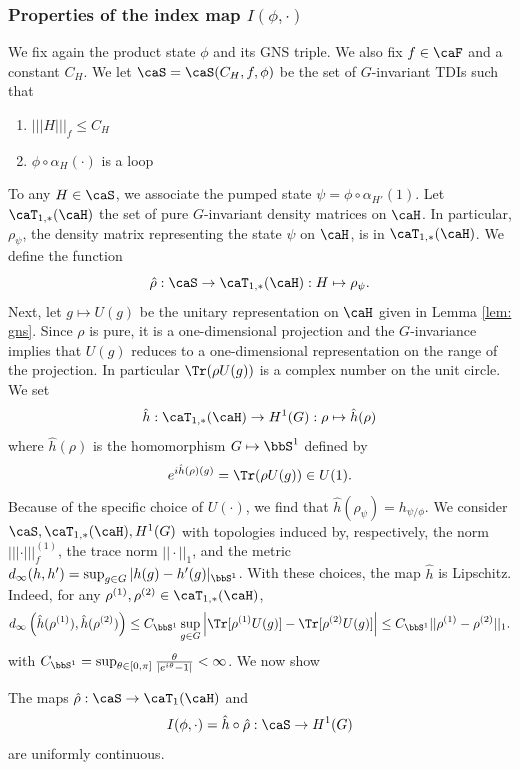 \subsubsection{Properties of the index map $I(\phi,\cdot)$}

We fix again the product state $\phi$  and its GNS triple. We also fix $f\in\caF$ and a constant $C_H$.  
We let  $\caS=\caS(C_H,f,\phi)$ be the set of $G$-invariant TDIs such that
\begin{enumerate}
	\item $|||H|||_f \leq C_H$
	\item $\phi\circ\alpha_H(\cdot)$ is a loop
\end{enumerate}
To any $H \in \caS$, we associate the pumped state $\psi=\phi\circ\alpha_{H'}(1)$. 
Let  $\caT_{1,*}(\caH)$ the set of pure $G$-invariant density matrices on $\caH$. In particular,  $\rho_\psi$, the density matrix representing the state $\psi$ on $\caH$, is in $\caT_{1,*}(\caH)$.
We define the function
$$
\hat\rho: \caS\to \caT_{1,*}(\caH): H\mapsto \rho_\psi.
$$
Next, let $g\mapsto U(g)$ be the unitary representation on $\caH$ given in Lemma \ref{lem: gns}. Since $\rho$ is pure, it is a one-dimensional projection and the $G$-invariance implies that $U(g)$ reduces to a one-dimensional representation on the range of the projection. In particular $\Tr( \rho U(g))$ is a complex number on the unit circle. We set 
$$
\hat{h}:  \caT_{1,*}(\caH) \to H^1(G): \rho \mapsto \hat{h}(\rho)
$$
where $\hat{h}(\rho)$ is the homomorphism $G\mapsto \bbS^1$ defined by 
\begin{equation}\label{expression for charge}
	e^{i \hat{h}(\rho)(g)}=\Tr( \rho U(g)) \in U(1).
\end{equation}
Because of the specific choice of $U(\cdot)$, we find that $\hat{h}(\rho_\psi)=h_{\psi/\phi}$. 
We consider $\caS,\caT_{1,*}(\caH), H^1(G)$ with  topologies induced by, respectively, the norm $|||\cdot|||^{(1)}_f$, the trace norm $||\cdot ||_1$, and the metric $d_\infty(h,h')=\sup_{g\in G}|h(g)-h'(g)|_{\bbS^1}$.  With these choices, the map $\hat{h}$ is Lipschitz. Indeed, for any $\rho^{(1)},\rho^{(2)} \in \caT_{1,*}(\caH) $,
$$
d_{\infty}\left(\hat{h}(\rho^{(1)}),\hat{h}(\rho^{(2)})\right)
\leq 
C_{\bbS^1} \sup_{g\in G} \left|\Tr [\rho^{(1)} U(g)] -\Tr [\rho^{(2)} U(g)] \right| \leq C_{\bbS^1} ||\rho^{(1)}-\rho^{(2)}||_1. 
$$
with $ C_{\bbS^1}=\sup_{\theta\in [0,\pi] } \frac{\theta}{ |e^{i\theta}-1|}  <\infty $. 
We now show 
\begin{lemma}\label{lem: uniform cont index}
	The maps
	$ \hat{\rho}: \caS \to \caT_1(\caH)$ and 
	$$
	I(\phi,\cdot)=\hat h\circ \hat\rho:   \caS \to H^1(G)  
	$$
	are uniformly continuous. 
\end{lemma}
